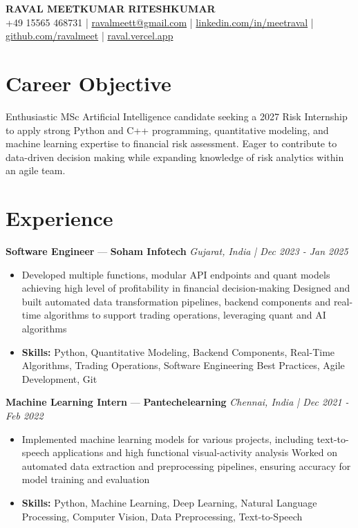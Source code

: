 \documentclass[a4paper,10pt]{article}
\begin{document}
\begin{center}
  {\Large\bfseries RAVAL MEETKUMAR RITESHKUMAR}\\[2pt]
  {\small +49 15565 468731 \;|\; \href{mailto:ravalmeett@gmail.com}{ravalmeett@gmail.com} \;|\; \href{https://www.linkedin.com/in/meetraval/}{linkedin.com/in/meetraval} \;|\; \href{https://github.com/ravalmeet}{github.com/ravalmeet} \;|\; \href{https://raval.vercel.app/}{raval.vercel.app}}
\end{center}
\vspace{-3pt}

\section*{Career Objective}
Enthusiastic MSc Artificial Intelligence candidate seeking a 2027 Risk Internship to apply strong Python and C++ programming, quantitative modeling, and machine learning expertise to financial risk assessment. Eager to contribute to data-driven decision making while expanding knowledge of risk analytics within an agile team.\par

\section*{Experience}
\textbf{Software Engineer} — \textbf{Soham Infotech} \hfill \textit{Gujarat, India \;|\; Dec 2023 - Jan 2025}\par
\vspace{1pt}
\begin{itemize}
  \item Developed multiple functions, modular API endpoints and quant models achieving high level of profitability in financial decision-making Designed and built automated data transformation pipelines, backend components and real-time algorithms to support trading operations, leveraging quant and AI algorithms
  \item \textbf{Skills:} Python, Quantitative Modeling, Backend Components, Real-Time Algorithms, Trading Operations, Software Engineering Best Practices, Agile Development, Git
\end{itemize}
\vspace{3pt}
\textbf{Machine Learning Intern} — \textbf{Pantechelearning} \hfill \textit{Chennai, India \;|\; Dec 2021 - Feb 2022}\par
\vspace{1pt}
\begin{itemize}
  \item Implemented machine learning models for various projects, including text-to-speech applications and high functional visual-activity analysis Worked on automated data extraction and preprocessing pipelines, ensuring accuracy for model training and evaluation
  \item \textbf{Skills:} Python, Machine Learning, Deep Learning, Natural Language Processing, Computer Vision, Data Preprocessing, Text-to-Speech
\end{itemize}
\end{document}
